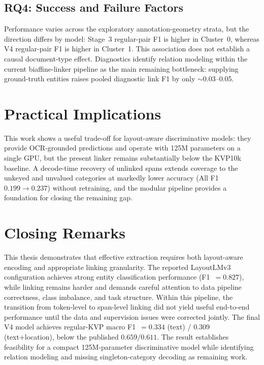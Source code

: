 \subsection{RQ4: Success and Failure Factors}
Performance varies across the exploratory annotation-geometry strata, but the
direction differs by model: Stage~3 regular-pair F1 is higher in Cluster~0,
whereas V4 regular-pair F1 is higher in Cluster~1. This association does not
establish a causal document-type effect. Diagnostics identify relation modeling within the current
biaffine-linker pipeline as the main remaining bottleneck: supplying
ground-truth entities raises pooled diagnostic link F1 by only
$\sim$0.03--0.05.

\section{Practical Implications}
\label{sec:implications}

This work shows a useful trade-off for layout-aware discriminative models: they
provide OCR-grounded predictions and operate with 125M parameters on a single
GPU, but the present linker remains substantially below the KVP10k baseline.
A decode-time recovery of unlinked spans extends coverage to the unkeyed and
unvalued categories at markedly lower accuracy (All F1 $0.199\!\to\!0.237$)
without retraining, and the modular pipeline provides a foundation for closing
the remaining gap.

\section{Closing Remarks}
\label{sec:closing}

This thesis demonstrates that effective \kvp{} extraction requires both
layout-aware encoding and appropriate linking granularity. The reported
LayoutLMv3 configuration achieves strong entity classification performance
(F1~$= 0.827$), while linking remains harder and demands careful attention to
data pipeline correctness, class imbalance, and task structure. Within this
pipeline, the transition from token-level to span-level linking did not yield
useful end-to-end performance until the data and supervision issues were
corrected jointly. The final
V4 model achieves regular-KVP macro F1~$=0.334$ (text) / $0.309$
(text+location), below the published $0.659/0.611$. The result establishes
feasibility for a compact 125M-parameter discriminative model while identifying
relation modeling and missing singleton-category decoding as remaining work.
